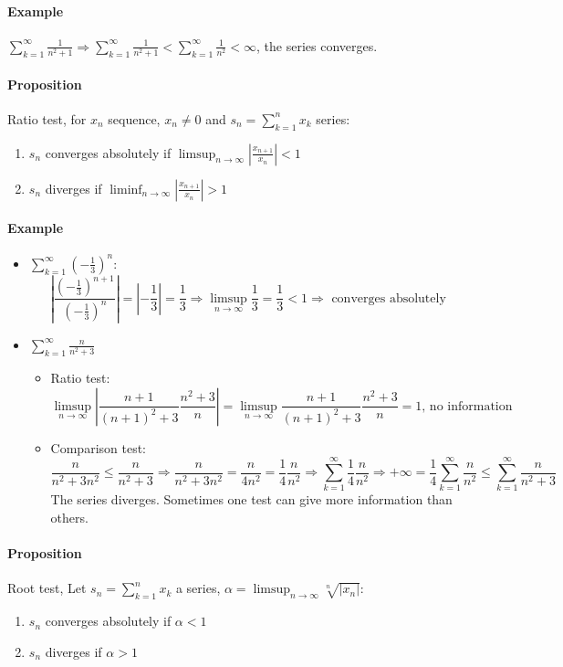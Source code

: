 \documentclass{article}
\newcommand{\DS}{\displaystyle}
\newcommand{\abs}[1]{\left|#1\right|}
\newcommand{\limsupn}{\limsup_{n \to \infty}}
\newcommand{\liminfn}{\liminf_{n \to \infty}}
\newcommand{\sumn}[1]{\sum_{k=1}^n #1}
\newcommand{\series}[1]{\sum_{k=1}^\infty #1}
\newcommand{\Proposition}{\paragraph{Proposition}}
\newcommand{\Example}{\paragraph{Example}}
\begin{document}
	\Example $\DS \series \frac{1}{n^2+1} \Rightarrow \series \frac{1}{n^2+1} <
	\series \frac{1}{n^2} < \infty$, the series converges.

	\Proposition Ratio test, for $x_n$ sequence, $x_n \neq 0$ and $\DS
	s_n = \sumn{x_k}$ series:
	\begin{enumerate}[label=(\roman*)]
		\item $s_n$ converges absolutely if $\limsupn \abs{\frac{x_{n+1}}{x_n}} < 1$
		\item $s_n$ diverges if $\liminfn \abs{\frac{x_{n+1}}{x_n}} > 1$
	\end{enumerate}

	\Example
	\begin{itemize}
		\item $\DS \series\left({-\frac{1}{3}}\right)^n$:
		\begin{equation*}
			\abs{\frac{(-\frac{1}{3})^{n+1}}{(-\frac{1}{3})^n}} = \abs{-\frac{1}{3}}
			= \frac{1}{3} \Rightarrow \limsupn \frac{1}{3} = \frac{1}{3} < 1
			\Rightarrow \text{ converges absolutely}
		\end{equation*}
		\item $\DS \series \frac{n}{n^2+3}$
			\begin{itemize}
				\item Ratio test:
				\begin{equation*}
					\limsupn \abs{\frac{n+1}{(n+1)^2+3}\frac{n^2+3}{n}} =
					\limsupn \frac{n+1}{(n+1)^2+3}\frac{n^2+3}{n} = 1 \text{, no information}
				\end{equation*}
				\item Comparison test:
				\begin{equation*}
					\frac{n}{n^2+3n^2} \leq \frac{n}{n^2+3} \Rightarrow
					\frac{n}{n^2+3n^2} = \frac{n}{4n^2} = \frac{1}{4} \frac{n}{n^2}
					\Rightarrow \series \frac{1}{4} \frac{n}{n^2} \Rightarrow
					+\infty = \frac{1}{4} \series \frac{n}{n^2} \leq \series \frac{n}{n^2+3}
				\end{equation*}
				The series diverges. Sometimes one test can give more information than
				others.
			\end{itemize}
	\end{itemize}

	\Proposition Root test, Let $\DS s_n = \sumn{x_k}$ a series, $\DS \alpha =
	\limsupn \sqrt[n]{\abs{x_n}}$:
	\begin{enumerate}[label=(\roman*)]
		\item $s_n$ converges absolutely if $\alpha < 1$
		\item $s_n$ diverges if $\alpha > 1$
	\end{enumerate}
\end{document}
